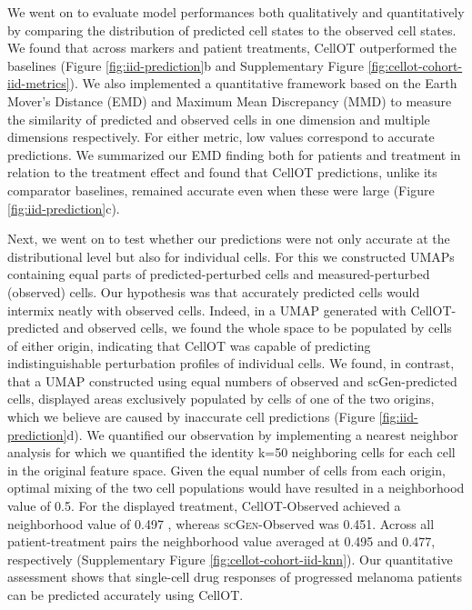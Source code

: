 We went on to evaluate model performances both qualitatively and quantitatively by comparing the distribution of predicted cell states to the observed cell states.
We found that across markers and patient treatments, CellOT outperformed the baselines (Figure \ref{fig:iid-prediction}b and Supplementary Figure \ref{fig:cellot-cohort-iid-metrics}).
We also implemented a quantitative framework based on the Earth Mover’s Distance (EMD) \cite{villani2009} and Maximum Mean Discrepancy (MMD) \cite{gretton2012} to measure the similarity of predicted and observed cells in one dimension and multiple dimensions respectively.
For either metric, low values correspond to accurate predictions.
We summarized our EMD finding both for patients and treatment in relation to the treatment effect and found that CellOT predictions, unlike its comparator baselines, remained accurate even when these were large (Figure \ref{fig:iid-prediction}c).  

Next, we went on to test whether our predictions were not only accurate at the distributional level but also for individual cells.
For this we constructed UMAPs containing equal parts of predicted-perturbed cells and measured-perturbed (observed) cells.
Our hypothesis was that accurately predicted cells would intermix neatly with observed cells.
Indeed, in a UMAP generated with CellOT-predicted and observed cells, we found the whole space to be populated by cells of either origin, indicating that CellOT was capable of predicting indistinguishable perturbation profiles of individual cells.
We found, in contrast, that a UMAP constructed using equal numbers of observed and scGen-predicted cells, displayed areas exclusively populated by cells of one of the two origins, which we believe are caused by inaccurate cell predictions (Figure \ref{fig:iid-prediction}d).
We quantified our observation by implementing a nearest neighbor analysis for which we quantified the identity k=50 neighboring cells for each cell in the original feature space.
Given the equal number of cells from each origin, optimal mixing of the two cell populations would have resulted in a neighborhood value of 0.5. For the displayed treatment, CellOT-Observed achieved a neighborhood value of 0.497 , whereas \textsc{scGen}-Observed was 0.451.
Across all patient-treatment pairs the neighborhood value averaged at 0.495 and 0.477, respectively (Supplementary Figure \ref{fig:cellot-cohort-iid-knn}).
Our quantitative assessment shows that single-cell drug responses of progressed melanoma patients can be predicted accurately using CellOT. 

